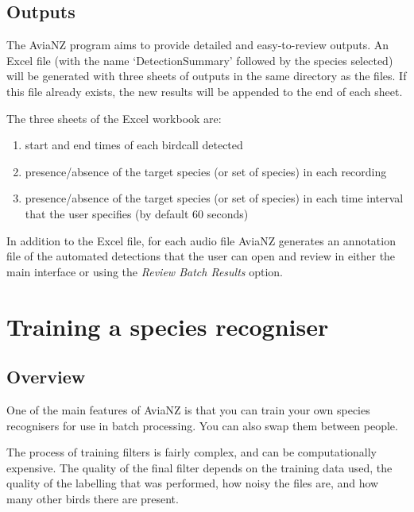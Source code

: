 \documentclass{scrartcl}
\begin{document}
\subsection{Outputs}
\label{sec:outputs}

The AviaNZ program aims to provide detailed and easy-to-review outputs. An Excel file (with the name `DetectionSummary' followed by the species selected) will be generated with three sheets of outputs in the same directory as the files. If this file already exists, the new results will be appended to the end of each sheet. 

The three sheets of the Excel workbook are:
\begin{enumerate}
\item start and end times of each birdcall detected
\item presence/absence of the target species (or set of species) in each recording
\item  presence/absence of the target species (or set of species) in each time interval that the user specifies (by default 60 seconds)
\end{enumerate}

In addition to the Excel file, for each audio file AviaNZ generates an annotation file of the automated detections that  the user can open and review in either the main interface or using the \textit{Review Batch Results} option. 

\newpage
\section{Training a species recogniser}\label{sec:trainfilter}

\subsection{Overview}

One of the main features of AviaNZ is that you can train your own species recognisers for use in batch processing. You can also swap them between people.%

The process of training filters is fairly complex, and can be computationally expensive. The quality of the final filter depends on the training data used, the quality of the labelling that was performed, how noisy the files are, and how many other birds there are present.
\end{document}
